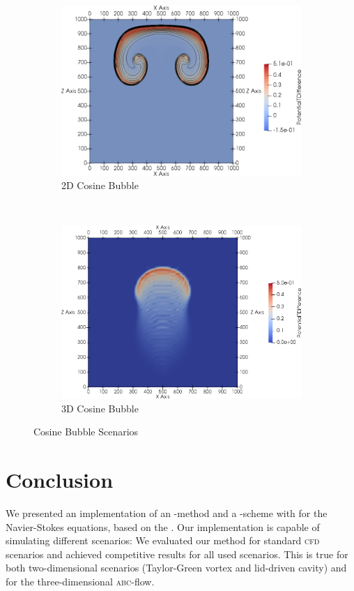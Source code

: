 \documentclass[runningheads]{llncs}
\begin{document}
\begin{figure}[tb]
  \centering
  \begin{subfigure}[t]{0.5\textwidth}
    \centering
    \includegraphics[width=\textwidth]{paper_cosine_bubble}
    \caption{\label{fig:cosine-2d}2D Cosine Bubble}
  \end{subfigure}~%
  \begin{subfigure}[t]{0.5\textwidth}
    \centering
    \includegraphics[width=\textwidth]{paper_cosine_bubble_3d}
    \caption{3D Cosine Bubble}
  \end{subfigure}
  \caption{\label{fig:cosine-3d}Cosine Bubble Scenarios}
  \label{fig:cosine-bubbles-results}
\end{figure}


\section{Conclusion}
We presented an implementation of an \aderdg{}-method and a \muscl{}-scheme with \amr{} for the Navier-Stokes equations, based on the \exahypeengine.
Our implementation is capable of simulating different scenarios: 
We evaluated our method for standard \textsc{cfd} scenarios and achieved competitive results for all used scenarios.
This is true for both two-dimensional scenarios (Taylor-Green vortex and lid-driven cavity) and for the three-dimensional \textsc{abc}-flow.
\end{document}
